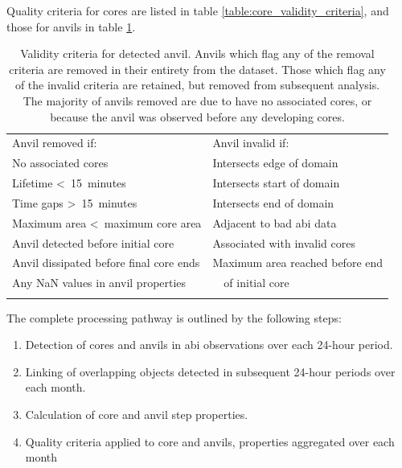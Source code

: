 Quality criteria for cores are listed in table \ref{table:core_validity_criteria}, and those for anvils in table \ref{table:anvil_validity_criteria}.



\begin{table}[tb]
\centering
\begin{tabular}{ll}
\tophline
Anvil removed if:                               & Anvil invalid if: \\
\middlehline
No associated cores                             & Intersects edge of domain \\
Lifetime \textless~15~minutes                   & Intersects start of domain \\             
Time gaps \textgreater~15~minutes               & Intersects end of domain \\
Maximum area \textless~maximum core area        & Adjacent to bad \acrshort{abi} data \\
Anvil detected before initial core              & Associated with invalid cores \\
Anvil dissipated before final core ends         & Maximum area reached before end \\
Any NaN values in anvil properties              & ~~of initial core \\
\bottomhline
\end{tabular}
\caption[
Validity criteria for detected anvils
]{
Validity criteria for detected anvil. Anvils which flag any of the removal criteria are removed in their entirety from the dataset. Those which flag any of the invalid criteria are retained, but removed from subsequent analysis. The majority of anvils removed are due to have no associated cores, or because the anvil was observed before any developing cores.}
\label{table:anvil_validity_criteria}
\end{table}


The complete processing pathway is outlined by the following steps:

\begin{enumerate}
    \item Detection of cores and anvils in \acrshort{abi} observations over each 24-hour period.
    \item Linking of overlapping objects detected in subsequent 24-hour periods over each month.
    \item Calculation of core and anvil step properties. 
    \item Quality criteria applied to core and anvils, properties aggregated over each month
\end{enumerate}

